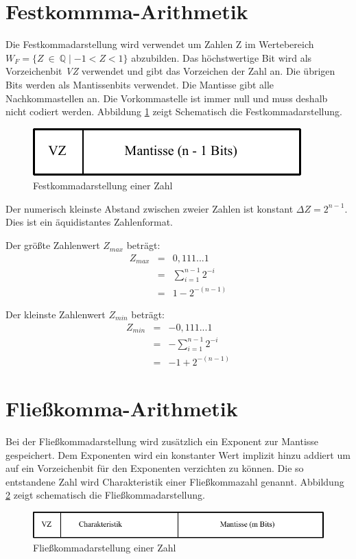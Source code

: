 \documentclass[11pt,a4paper]{scrreprt}
\begin{document}
\section{Festkommma-Arithmetik}
Die Festkommadarstellung wird verwendet um Zahlen Z im Wertebereich $W_F = \{ Z~\in~\mathbb{Q} \mid -1 < Z < 1\}$ abzubilden. Das höchstwertige Bit wird als Vorzeichenbit \textit{VZ} verwendet und gibt das Vorzeichen der Zahl an. Die übrigen Bits werden als Mantissenbits verwendet. Die Mantisse gibt alle Nachkommastellen an. Die Vorkommastelle ist immer null und muss deshalb nicht codiert werden. Abbildung \ref{Festkommadarstellung} zeigt Schematisch die Festkommadarstellung.

\begin{figure}[htbp] %
	\centering
	\includegraphics{Festkommaarithmetik.pdf}
	\caption{Festkommadarstellung einer Zahl}
	\label{Festkommadarstellung}
\end{figure}

Der numerisch kleinste Abstand zwischen zweier Zahlen ist konstant $\Delta Z = 2^{n-1}$. Dies ist ein äquidistantes Zahlenformat.

Der größte Zahlenwert $Z_{max}$ beträgt:
\begin{eqnarray*}
Z_{max} &=& 0,111...1              \\
        &=& \sum_{i=1}^{n-1}2^{-i} \\
        &=& 1 - 2^{-(n-1)}
\end{eqnarray*}

Der kleinste Zahlenwert $Z_{min}$ beträgt:
\begin{eqnarray*}
Z_{min} &=& -0,111...1              \\
        &=& -\sum_{i=1}^{n-1}2^{-i} \\
        &=& -1 + 2^{-(n-1)}
\end{eqnarray*}

\section{Fließkomma-Arithmetik}
Bei der Fließkommadarstellung wird zusätzlich ein Exponent zur Mantisse  gespeichert. Dem Exponenten wird ein konstanter Wert implizit hinzu addiert um auf ein Vorzeichenbit für den Exponenten verzichten zu können. Die so entstandene Zahl wird Charakteristik einer Fließkommazahl genannt. Abbildung \ref{Fliesskommadarstellung} zeigt schematisch die Fließkommadarstellung.
\begin{figure}[htbp] %
	\centering
	\includegraphics{Fliesskommaarithmetik.pdf}
	\caption{Fließkommadarstellung einer Zahl}
	\label{Fliesskommadarstellung}
\end{figure}
\end{document}
